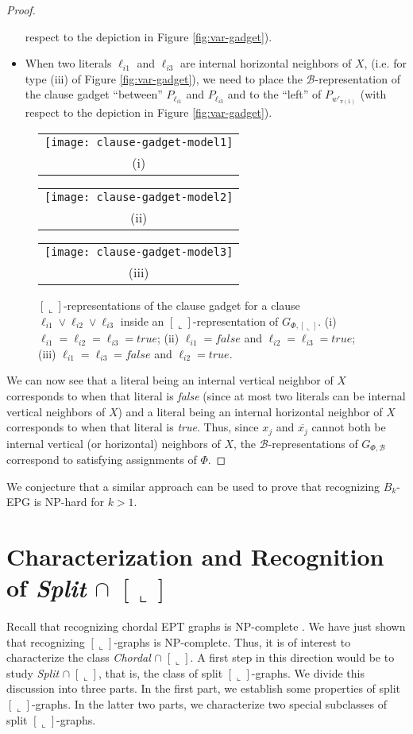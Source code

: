 \documentclass[11pt,3p,times]{elsarticle}
\newenvironment{myproof}{\begin{proof}}{\end{proof}}
\newcommand{\La}{\ensuremath{\llcorner}} \newcommand{\Lb}{\ensuremath{\ulcorner}} \newcommand{\Lc}{\ensuremath{\lrcorner}} \newcommand{\Ld}{\ensuremath{\urcorner}}
\begin{document}
\begin{myproof}
\begin{itemize}
respect to the depiction in Figure \ref{fig:var-gadget}).
\item When two literals $\ell_{i1}$ and $\ell_{i3}$ are
internal horizontal neighbors of $X$, (i.e. for type (iii)
of Figure \ref{fig:var-gadget}), we need to place the
$\mathcal{B}$-representation of the clause gadget ``between''
$P_{\ell_{i1}}$ and $P_{\ell_{i3}}$ and to the ``left'' of
$P_{w'_{\pi(1)}}$ (with respect to the depiction in Figure
\ref{fig:var-gadget}).
\end{itemize}
\begin{figure}[h]
\begin{tabular}{c}
\texttt{[image: clause-gadget-model1]} \\
(i)
\end{tabular}
\hfill
\begin{tabular}{c}
\texttt{[image: clause-gadget-model2]} \\
(ii)
\end{tabular}
\hfill
\begin{tabular}{c}
\texttt{[image: clause-gadget-model3]} \\
(iii)
\end{tabular}
\caption{$[\La]$-representations of the clause gadget for a clause
$\ell_{i1} \vee \ell_{i2} \vee \ell_{i3}$ inside an $[\La]$-representation of
$G_{\Phi,[\La]}$. (i) $\ell_{i1} = \ell_{i2} = \ell_{i3} = true$; (ii) $\ell_{i1} =
false$ and $\ell_{i2} = \ell_{i3} = true$; (iii) $\ell_{i1} = \ell_{i3} =
false$ and $\ell_{i2} = true$.} \label{fig:clause-gadget}
\end{figure}
We can now see that a literal being an internal vertical neighbor
of $X$ corresponds to when that literal is \emph{false} (since at
most two literals can be internal vertical neighbors of $X$) and a
literal being an internal horizontal neighbor of $X$ corresponds
to when that literal is \emph{true}. Thus, since $x_j$ and
$\overline{x_j}$ cannot both be internal vertical (or horizontal)
neighbors of $X$, the $\mathcal{B}$-representations of 
$G_{\Phi,\mathcal{B}}$ correspond to satisfying assignments of $\Phi$.
\end{myproof}




\noindent We conjecture that a similar approach can be used to prove
that recognizing $B_k$-EPG is NP-hard for $k>1$. 


\section{Characterization and Recognition of {\em Split} $\cap$ $[\La]$}
\label{sec:split}
Recall that recognizing chordal EPT graphs is NP-complete \cite{Gol1985}. We have
just shown that recognizing $[\La]$-graphs is NP-complete. Thus,
it is of interest to characterize the class {\em Chordal} $ \cap
\; [\La]$. A first step in this direction would be to study {\em
Split} $ \cap \; [\La]$, that is, the class of split
$[\La]$-graphs. We divide this discussion into three parts. In the
first part, we establish some properties of split $[\La]$-graphs.
In the latter two parts, we characterize two special subclasses of
split $[\La]$-graphs.
\end{document}
